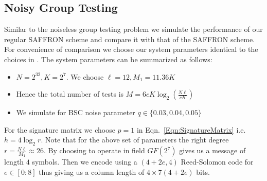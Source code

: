 \documentclass[conference,,twocolumn]{IEEEtran}
\newcommand*{\MyPath}{../bib}
\begin{document}
\subsection*{Noisy Group Testing}
Similar to the noiseless group testing problem we simulate the performance of our regular SAFFRON scheme and compare it with that of the SAFFRON scheme. For convenience of comparison we choose our system parameters identical to the choices in \cite{lee2015saffron}. The system parameters can be summarized as follows:
\begin{itemize}
\item $N=2^{32}, K=2^7$. We choose  $\ell=12, M_1=11.36K$ 
\item Hence the total number of tests is $M=6cK\log_2 \left(\frac{N\ell}{cK}\right)$
\item We simulate for BSC noise parameter $q\in\{0.03,0.04,0.05\}$
\end{itemize}
For the signature matrix we choose $p=1$ in Eqn.~\ref{Eqn:SignatureMatrix} i.e. $h=4\log_2 r$. Note that for the above set of parameters the right degree $r=\frac{N\ell}{M_1}\approx 26$. By choosing to operate in field $GF(2^7)$ gives us a message of length $4$ symbols. Then we encode using a $(4+2e,4)$ Reed-Solomon code for $e\in[0:8]$ thus giving us a column length of $4\times 7(4+2e)$ bits.


\end{document}

